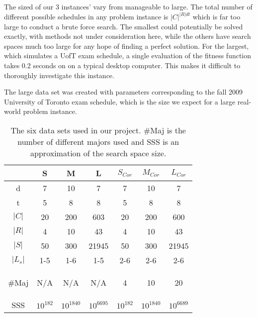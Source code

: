 \documentclass[letterpaper]{article}
\begin{document}
    The sized of our 3 instances' vary from manageable to large. The total number 
    of different possible schedules in any problem instance is $|C|^{|R|dt}$ which 
    is far too large to conduct a brute force search. The smallest could potentially 
    be solved exactly, with methods not under consideration here, while the others 
    have search spaces much too large for any hope of finding a perfect solution. 
    For the largest, which simulates a UofT exam schedule, a single evaluation of 
    the fitness function takes 0.2 seconds on on a typical desktop computer. This 
    makes it difficult to thoroughly investigate this instance.
    
    The large data set was created with parameters corresponding to the fall 2009 
	University of Toronto exam schedule, which is the size we expect for a large 
	real-world problem instance.
	
    \begin{table}[h]
    \begin{small}
    \begin{tabular}{*{7}{c}}
    \hline 
 	  	& S 	& M 	& L 	& $S_{Cor}$ & $M_{Cor}$ & $L_{Cor}$ \\ 
    \hline \hline
     d 		& 7 	& 10	& 7 	& 7 	& 10 	& 7 	\\ 
     t 		& 5		& 8 	& 8 	& 5 	& 8 	& 8 	\\ 
     $|C|$	& 20 	& 200 	& 603 	& 20 	& 200 	& 600 	\\ 
     $|R|$	& 4 	& 10 	& 43 	& 4 	& 10 	& 43	\\ 
     $|S|$	& 50 	& 300 	& 21945 & 50 	& 300 	& 21945	\\ 
     $|L_s|$	& 1-5 	& 1-6 	& 1-5 	& 2-6 	& 2-6 	& 2-6 	\\ 
     \begin{tiny}$\#$Maj\end{tiny}	& N/A 	& N/A 	& N/A 	& 4 	& 10 	& 20 	\\ 
     \textsc{SSS}	& $10^{182}$ & $10^{1840}$ & $10^{6695}$ & $10^{182}$ & $10^{1840}$ & $10^{6689}$ \\
    \hline  
    \end{tabular} 
	\end{small}
	\caption{The six data sets used in our project. $\#$Maj is the number of different 
	         majors used and \textsc{SSS} is an approximation of the search space size.}
	\end{table}
	
\end{document}
